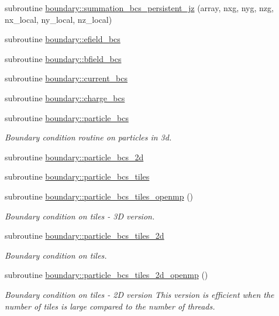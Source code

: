 \begin{DoxyCompactItemize}
\item 
subroutine \hyperlink{namespaceboundary_ad2325e9a68255f71d1cafcee47b1ff9a}{boundary\+::summation\+\_\+bcs\+\_\+persistent\+\_\+jz} (array, nxg, nyg, nzg, nx\+\_\+local, ny\+\_\+local, nz\+\_\+local)
\item 
subroutine \hyperlink{namespaceboundary_a2397a80ea9511ae3266ad16c668cc547}{boundary\+::efield\+\_\+bcs}
\item 
subroutine \hyperlink{namespaceboundary_af2316f12b3b85debc7214c4c47035322}{boundary\+::bfield\+\_\+bcs}
\item 
subroutine \hyperlink{namespaceboundary_a2bd382bbf256b1208d4fd3721c37ad08}{boundary\+::current\+\_\+bcs}
\item 
subroutine \hyperlink{namespaceboundary_a0b6d77029b51dd2a0e853c265885ab6c}{boundary\+::charge\+\_\+bcs}
\item 
subroutine \hyperlink{namespaceboundary_a9e7ba00d025d595683607b3ccd95bcb3}{boundary\+::particle\+\_\+bcs}
\begin{DoxyCompactList}\small\item\em Boundary condition routine on particles in 3d. \end{DoxyCompactList}\item 
subroutine \hyperlink{namespaceboundary_aad89819169dca0b0ae8cf04748a86fb1}{boundary\+::particle\+\_\+bcs\+\_\+2d}
\item 
subroutine \hyperlink{namespaceboundary_added6cf2ea0ffc7ab618c3d9af16fade}{boundary\+::particle\+\_\+bcs\+\_\+tiles}
\item 
subroutine \hyperlink{namespaceboundary_af6d7a140eef6818609e44869b67cd3a7}{boundary\+::particle\+\_\+bcs\+\_\+tiles\+\_\+openmp} ()
\begin{DoxyCompactList}\small\item\em Boundary condition on tiles -\/ 3D version. \end{DoxyCompactList}\item 
subroutine \hyperlink{namespaceboundary_afb4e6ab09e288dab2bb9ce2d731e276f}{boundary\+::particle\+\_\+bcs\+\_\+tiles\+\_\+2d}
\begin{DoxyCompactList}\small\item\em Boundary condition on tiles. \end{DoxyCompactList}\item 
subroutine \hyperlink{namespaceboundary_a9f9517df19ef503bb2a69e63aeec91d4}{boundary\+::particle\+\_\+bcs\+\_\+tiles\+\_\+2d\+\_\+openmp} ()
\begin{DoxyCompactList}\small\item\em Boundary condition on tiles -\/ 2D version This version is efficient when the number of tiles is large compared to the number of threads. \end{DoxyCompactList}\item 

\end{DoxyCompactItemize}
